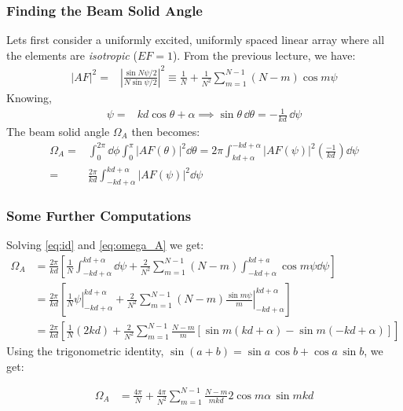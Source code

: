 \documentclass[10pt]{beamer}
\begin{document}
\begin{frame}
    \frametitle{Finding the Beam Solid Angle}
\small
    Lets first consider a uniformly excited, uniformly spaced linear array where all the elements are \textit{isotropic} ($EF = 1$). From the previous lecture, we have:
    \small
    \begin{align}
        |AF|^2 {}=& \left|\frac{\sin N \psi/2 }{N \sin \psi/2 }\right|^2 \equiv \frac{1}{N} + \frac{1}{N^2} \sum_{m = 1}^{N-1} (N - m) \cos m \psi
        \label{eq:id}
    \end{align}
    \small
    Knowing,
    \small
    \begin{align*}
        \psi {}=& k d \cos \theta + \alpha
        \implies \sin \theta \, \dd \theta = -\frac{1}{k d} \, \dd \psi
    \end{align*}
\small
The beam solid angle $\Omega_A$ then becomes:
\small
\begin{align}
    \Omega_A {}=& \int_{0}^{2 \pi} \dd \phi \int_{0}^{\pi} |AF(\theta)|^2 \dd \theta = 2 \pi \int_{kd + \alpha}^{{-kd + \alpha}} |AF(\psi)|^2 \left(\frac{-1}{kd}\right) \dd \psi \nonumber \\
    {}=& \frac{2 \pi }{k d} \int_{-kd + \alpha}^{{kd + \alpha}} |AF(\psi)|^2 \dd \psi
    \label{eq:omega_A}
\end{align}
\end{frame}


\begin{frame}
    \frametitle{Some Further Computations}

    Solving \eqref{eq:id} and \eqref{eq:omega_A} we get:
    \begin{align*}
        \Omega_{A} &=\frac{2 \pi}{k d}\left[\frac{1}{N} \int_{-k d+\alpha}^{k d+\alpha} \dd \psi+\frac{2}{N^{2}} \sum_{m=1}^{N-1}(N-m) \int_{-k d+\alpha}^{k d+a} \cos m \psi \dd \psi\right] \\
        &=\frac{2 \pi}{k d}\left[\left.\frac{1}{N} \psi\right|_{-k d+\alpha} ^{k d+\alpha}+\left.\frac{2}{N^{2}} \sum_{m=1}^{N-1}(N-m) \frac{\sin m \psi}{m}\right|_{-k d+\alpha} ^{k d+\alpha}\right] \\
        &=\frac{2 \pi}{k d}\left[\frac{1}{N}(2 k d)+\frac{2}{N^{2}} \sum_{m=1}^{N-1} \frac{N-m}{m}[\sin m(k d+\alpha)-\sin m(-k d+\alpha)]\right]
        \end{align*}
    Using the trigonometric identity, $\sin (a+b) = \sin a \, \cos b + \cos a \, \sin b$, we get:
    \begin{tcolorbox}[colback=blue!5]
        \begin{align*}
            \Omega_A   &=\frac{4 \pi}{N}+\frac{4 \pi}{N^{2}} \sum_{m=1}^{N-1} \frac{N-m}{m k d} 2 \cos m \alpha \, \sin m k d
           \end{align*}
  \end{tcolorbox}
\end{frame}
\end{document}
